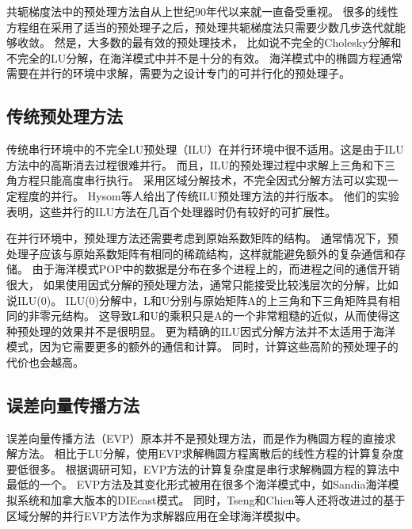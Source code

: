 共轭梯度法中的预处理方法自从上世纪90年代以来就一直备受重视。 
很多的线性方程组在采用了适当的预处理子之后，预处理共轭梯度法只需要少数几步迭代就能够收敛。 
然是，大多数的最有效的预处理技术， 比如说不完全的Cholesky分解和不完全的LU分解，在海洋模式中并不是十分的有效。 
海洋模式中的椭圆方程通常需要在并行的环境中求解，需要为之设计专门的可并行化的预处理子。 



\subsection{传统预处理方法}
\label{related:classical}

传统串行环境中的不完全LU预处理（ILU）在并行环境中很不适用。这是由于ILU方法中的高斯消去过程很难并行。 
而且，ILU的预处理过程中求解上三角和下三角方程只能高度串行执行。
采用区域分解技术，不完全因式分解方法可以实现一定程度的并行。 
Hysom等人\cite{hysom2001scalable}给出了传统ILU预处理方法的并行版本。 
他们的实验表明，这些并行的ILU方法在几百个处理器时仍有较好的可扩展性。

在并行环境中，预处理方法还需要考虑到原始系数矩阵的结构。 
通常情况下，预处理子应该与原始系数矩阵有相同的稀疏结构，这样就能避免额外的复杂通信和存储。 
由于海洋模式POP中的数据是分布在多个进程上的，而进程之间的通信开销很大， 如果使用因式分解的预处理方法，通常只能接受比较浅层次的分解，比如说ILU(0)。 
ILU(0)分解中，L和U分别与原始矩阵A的上三角和下三角矩阵具有相同的非零元结构\cite{benzi2002preconditioning}。
这导致L和U的乘积只是A的一个非常粗糙的近似，从而使得这种预处理的效果并不是很明显。 
更为精确的ILU因式分解方法并不太适用于海洋模式，因为它需要更多的额外的通信和计算。 
同时，计算这些高阶的预处理子的代价也会越高。 

\subsection{误差向量传播方法}
\label{related:evp}


误差向量传播方法（EVP）原本并不是预处理方法，而是作为椭圆方程的直接求解方法。 
相比于LU分解，使用EVP求解椭圆方程离散后的线性方程的计算复杂度要低很多。 
根据调研可知，EVP方法的计算复杂度是串行求解椭圆方程的算法中最低的一个。
EVP方法及其变化形式被用在很多个海洋模式中，如Sandia海洋模拟系统\cite{dietrich1987ocean}和加拿大版本的DIEcast模式\cite{tseng2011parallel}。 
同时，Tseng和Chien等人还将改进过的基于区域分解的并行EVP方法作为求解器应用在全球海洋模拟中。

